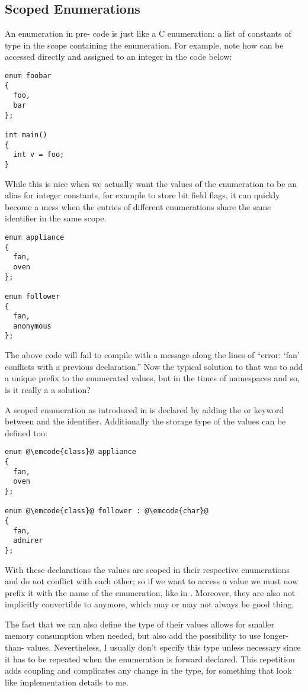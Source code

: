 \subsection{Scoped Enumerations}

An enumeration in pre- code is just like a C enumeration: a list
of constants of type  in the scope containing the
enumeration. For example, note how  can be accessed
directly and assigned to an integer in the code below:

\begin{lstlisting}
enum foobar
{
  foo,
  bar
};

int main()
{
  int v = foo;
}
\end{lstlisting}

While this is nice when we actually want the values of the
enumeration to be an alias for integer constants, for example to store
bit field flags, it can quickly become a mess when the entries of
different enumerations share the same identifier in the same scope.

\begin{lstlisting}
enum appliance
{
  fan,
  oven
};

enum follower
{
  fan,
  anonymous
};
\end{lstlisting}

The above code will fail to compile with a message along the lines of
``error: ‘fan’ conflicts with a previous declaration.'' Now the
typical solution to that was to add a unique prefix to the enumerated
values, but in the times of namespaces and so, is it really a a solution?

\bigskip

A scoped enumeration as introduced in  is declared by adding the
 or  keyword between  and the
identifier. Additionally the storage type of the values can be defined
too:

\begin{lstlisting}
enum @\emcode{class}@ appliance
{
  fan,
  oven
};

enum @\emcode{class}@ follower : @\emcode{char}@
{
  fan,
  admirer
};
\end{lstlisting}

With these declarations the values are scoped in their respective
enumerations and do not conflict with each other; so if we want to
access a value we must now prefix it with the name of the enumeration,
like in . Moreover, they are also not implicitly
convertible to  anymore, which may or may not always be good
thing.

The fact that we can also define the type of their values allows for
smaller memory consumption when needed, but also add the possibility
to use longer-than- values. Nevertheless, I usually don't
specify this type unless necessary since it has to be repeated when
the enumeration is forward declared. This repetition adds coupling and
complicates any change in the type, for something that look like
implementation details to me.

